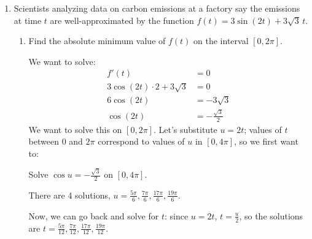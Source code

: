 \documentclass{article}
\begin{document}
\begin{enumerate}
\item
  \label{spring2011-midterm1-3-modified}
  
  Scientists analyzing data on carbon emissions at a factory say the
  emissions at time $t$ are well-approximated by the function $f(t)=3\sin
  (2t) + 3\sqrt 3\, t $.

  \begin{enumerate}
  \item 
    \begin{problem}[\vfill]
      Find the absolute minimum value of $f(t)$ on the
      interval $\left[0, 2 \pi \right]$.
    \end{problem}

    \begin{solution}
      We want to solve:
      \begin{align}
        f'(t) &= 0 \nonumber \\
        3 \cos(2t) \cdot 2 + 3 \sqrt{3} &= 0 \nonumber \\
        6 \cos (2t) &= -3 \sqrt{3} \nonumber \\
        \cos(2t) &= -
        \frac{\sqrt{3}}{2} \label{spring2011-midterm1-3-eq1} 
      \end{align}
      We want to solve this on $\left[0, 2 \pi \right]$.  Let's
      substitute $u = 2t$; values of $t$ between $0$ and $2 \pi$
      correspond to values of $u$ in $[0, 4 \pi]$, so we first want to:
      \begin{center}
        Solve $\cos u = - \frac{\sqrt{3}}{2}$ on $[0, 4 \pi]$.
      \end{center}
      There are 4 solutions, $u = \displaystyle \frac{5 \pi}{6}, \frac{7
        \pi}{6}, \frac{17 \pi}{6}, \frac{19 \pi}{6}$.

      Now, we can go back and solve for $t$: since $u = 2t$, $t =
      \frac{u}{2}$, so the solutions are $t = \frac{5 \pi}{12}, \frac{7
        \pi}{12}, \frac{17 \pi}{12}, \frac{19 \pi}{12}$.



\end{solution}
\end{enumerate}
\end{enumerate}
\end{document}
